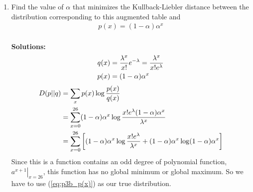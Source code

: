 \documentclass{assignment}
\begin{document}
\begin{enumerate}
\begin{enumerate}
  \item Find the value of $\alpha$ that minimizes the Kullback-Liebler distance between the distribution corresponding
    to this augmented table and
    \begin{align}
      p(x) = (1-\alpha) \alpha^x \label{eq:p3b_p(x)}
    \end{align}
    $$ $$ \\
    \textbf{Solutions:}\\
    \begin{align*}
      q(x) & = \dfrac{\lambda^x}{x!}e^{-\lambda} = \dfrac{\lambda^x}{x! e^{\lambda}} \\
      p(x) & = (1-\alpha) \alpha^x
    \end{align*}
    \begin{align*}
      D(p||q) & = \sum_x p(x)\log \dfrac{p(x)}{q(x)}\\
              & = \sum_{x=0}^{26} (1-\alpha) \alpha^x \log \dfrac{x!e^{\lambda}(1-\alpha) \alpha^x}{\lambda^x} \\
              & = \sum_{x=0}^{26} \left[(1-\alpha) \alpha^x\log \dfrac{x!e^{\lambda}}{\lambda^x}
                + (1-\alpha) \alpha^x\log (1-\alpha) \alpha^x\right]
    \end{align*}
    Since this is a function contains an odd degree of polynomial function, $\left.a^{x+1}\right|_{x=26}$, this function
    has no global minimum or global maximum. So we have to use (\ref{eq:p3b_p(x)}) as our true distribution.


\end{enumerate}
\end{enumerate}
\end{document}
